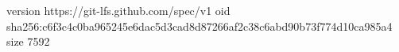 version https://git-lfs.github.com/spec/v1
oid sha256:c6f3c4c0ba965245e6dac5d3cad8d87266af2c38c6abd90b73f774d10ca985a4
size 7592
